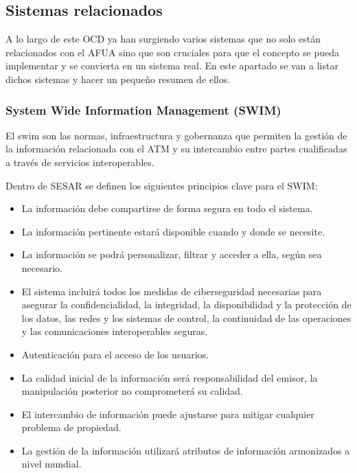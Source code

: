 \subsection{Sistemas relacionados}\label{tit:sistemas}

A lo largo de este OCD ya han surgiendo varios sistemas que no solo están relacionados con el AFUA sino que son cruciales para que el concepto se pueda implementar y se convierta en un sistema real. En este apartado se van a listar dichos sistemas y hacer un pequeño resumen de ellos.

\subsubsection{System Wide Information Management (SWIM)}

El \acrfull{swim} son las normas, infraestructura y gobernanza que permiten la gestión de la información relacionada con el ATM y su intercambio entre partes cualificadas a través de servicios interoperables.

Dentro de SESAR se definen los siguientes principios clave  para el SWIM:

\begin{itemize}
    \item La información debe compartirse de forma segura en todo el sistema.
    \item La información pertinente estará disponible cuando y donde se necesite.
    \item La información se podrá personalizar, filtrar y acceder a ella, según sea necesario.
    \item El sistema incluirá todos los medidas de ciberseguridad necesarias para asegurar la confidencialidad, la integridad, la disponibilidad y la protección de los datos, las redes y los sistemas de control, la continuidad de las operaciones y las comunicaciones interoperables seguras.
    \item Autenticación para el acceso de los usuarios.
    \item La calidad inicial de la información será responsabilidad del emisor, la manipulación posterior no comprometerá su calidad.
    \item El intercambio de información puede ajustarse para mitigar cualquier problema de propiedad.
    \item La gestión de la información utilizará atributos de información armonizados a nivel mundial.
\end{itemize}

